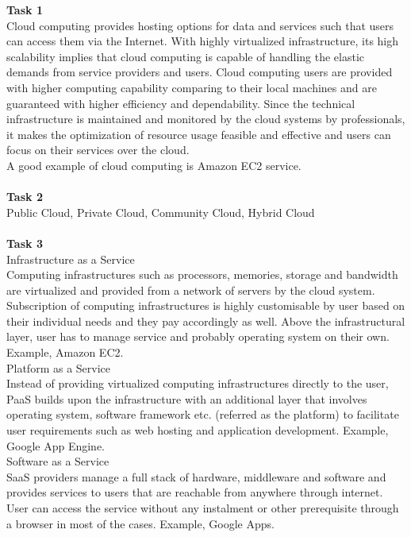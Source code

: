 \setlength{\parindent}{0pt}\textbf{\huge Task 1}\\ 

Cloud computing provides hosting options for data and services such that users can access them via the Internet. With highly virtualized infrastructure, its high scalability implies that cloud computing is capable of handling the elastic demands from service providers and users. Cloud computing users are provided with higher computing capability comparing to their local machines and are guaranteed with higher efficiency and dependability. Since the technical infrastructure is maintained and monitored by the cloud systems by professionals, it makes the optimization of resource usage feasible and effective and users can focus on their services over the cloud.\\
A good example of cloud computing is Amazon EC2 service.\\
\\

\setlength{\parindent}{0pt}\textbf{\huge Task 2}\\

Public Cloud, Private Cloud, Community Cloud, Hybrid Cloud\\
\\

\setlength{\parindent}{0pt}\textbf{\huge Task 3}\\

Infrastructure as a Service\\
Computing infrastructures such as processors, memories, storage and bandwidth are virtualized and provided from a network of servers by the cloud system. Subscription of computing infrastructures is highly customisable by user based on their individual needs and they pay accordingly as well. Above the infrastructural layer, user has to manage service and probably operating system on their own. Example, Amazon EC2.\\

Platform as a Service\\
Instead of providing virtualized computing infrastructures directly to the user, PaaS builds upon the infrastructure with an additional layer that involves operating system, software framework etc. (referred as the platform) to facilitate user requirements such as web hosting and application development. Example, Google App Engine.\\

Software as a Service\\
SaaS providers manage a full stack of hardware, middleware and software and provides services to users that are reachable from anywhere through internet. User can access the service without any instalment or other prerequisite through a browser in most of the cases. Example, Google Apps.
\\

